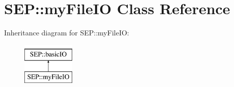 \hypertarget{class_s_e_p_1_1my_file_i_o}{}\section{S\+EP\+:\+:my\+File\+IO Class Reference}
\label{class_s_e_p_1_1my_file_i_o}
Inheritance diagram for S\+EP\+:\+:my\+File\+IO\+:\begin{figure}[H]
\begin{center}
\leavevmode
\includegraphics[height=2.000000cm]{class_s_e_p_1_1my_file_i_o}
\end{center}
\end{figure}
